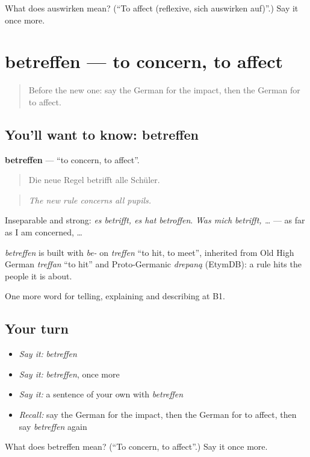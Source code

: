 \begin{tcolorbox}[breakable,colback=teal!4,colframe=teal!35!black,title={Before you move on}]
What does auswirken mean? (\textquotedblleft{}To affect (reflexive, sich auswirken auf)\textquotedblright{}.) Say it once more.
\end{tcolorbox}
\section[betreffen]{betreffen — to concern, to affect}

\label{lesson:GE-C344-betreffen}



\begin{quote}
Before the new one: say the German for the impact, then the German for to affect.
\end{quote}

\subsection*{You'll want to know: betreffen}
\textbf{betreffen} — \textquotedblleft{}to concern, to affect\textquotedblright{}.

\begin{quote}
Die neue Regel betrifft alle Schüler.
\end{quote}

\begin{quote}
\emph{The new rule concerns all pupils.}
\end{quote}

Inseparable and strong: \emph{es betrifft, es hat betroffen}. \emph{Was mich betrifft, …} — as far as I am concerned, …

\begin{cousinweb}
\emph{betreffen} is built with \emph{be-} on \emph{treffen} \textquotedblleft{}to hit, to meet\textquotedblright{}, inherited from Old High German \emph{treffan} \textquotedblleft{}to hit\textquotedblright{} and Proto-Germanic \emph{drepaną} (EtymDB): a rule hits the people it is about.
\end{cousinweb}

\begin{grammarlens}[title={What you've built}]
One more word for telling, explaining and describing at B1.
\end{grammarlens}

\subsection*{Your turn}
\begin{itemize}
\raggedright
  \item \emph{Say it:} \emph{betreffen}
  \item \emph{Say it:} \emph{betreffen}, once more
  \item \emph{Say it:} a sentence of your own with \emph{betreffen}
  \item \emph{Recall:} say the German for the impact, then the German for to affect, then say \emph{betreffen} again
\end{itemize}

\begin{tcolorbox}[breakable,colback=teal!4,colframe=teal!35!black,title={Before you move on}]
What does betreffen mean? (\textquotedblleft{}To concern, to affect\textquotedblright{}.) Say it once more.
\end{tcolorbox}
